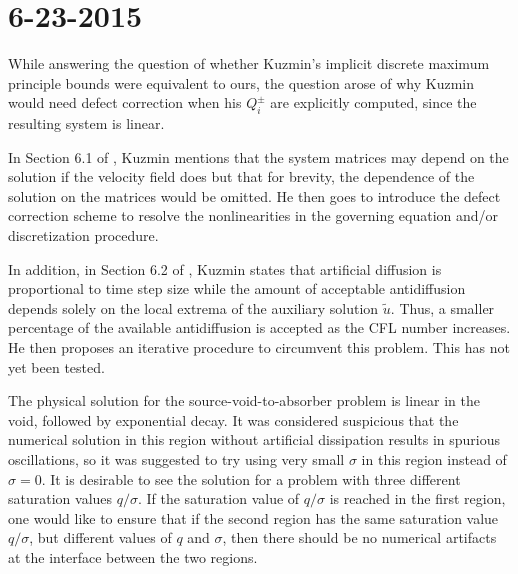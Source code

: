 \section*{6-23-2015}

\begin{enumerate}
While answering the question of whether Kuzmin's implicit discrete maximum
principle bounds were equivalent to ours, the question arose of why Kuzmin
would need defect correction when his $Q_i^\pm$ are explicitly computed,
since the resulting system is linear.

In Section 6.1 of \cite{kuzmin_FCT}, Kuzmin mentions that the system
matrices may depend on the solution if the velocity field does
but that for brevity, the dependence of the solution on the
matrices would be omitted. He then goes to introduce the defect correction
scheme to resolve the nonlinearities in the governing equation and/or
discretization procedure.

In addition, in Section 6.2 of \cite{kuzmin_FCT}, Kuzmin states
that artificial diffusion is proportional to time step size while
the amount of acceptable antidiffusion depends solely on the
local extrema of the auxiliary solution $\tilde{u}$. Thus, a
smaller percentage of the available antidiffusion is accepted
as the CFL number increases. He then proposes an iterative
procedure to circumvent this problem. This has not yet been tested.

The physical solution for the source-void-to-absorber problem is linear
in the void, followed by exponential decay. It was considered
suspicious that the numerical solution in this region without 
artificial dissipation results in spurious oscillations, so
it was suggested to try using very small $\sigma$ in this
region instead of $\sigma=0$.
It is desirable to see the solution for a problem with three
different saturation values $q/\sigma$.
If the saturation value of $q/\sigma$ is reached in the first
region, one would like to ensure that if the second region has
the same saturation value $q/\sigma$, but different values of
$q$ and $\sigma$, then there should be no numerical artifacts at
the interface between the two regions.
\end{enumerate}
